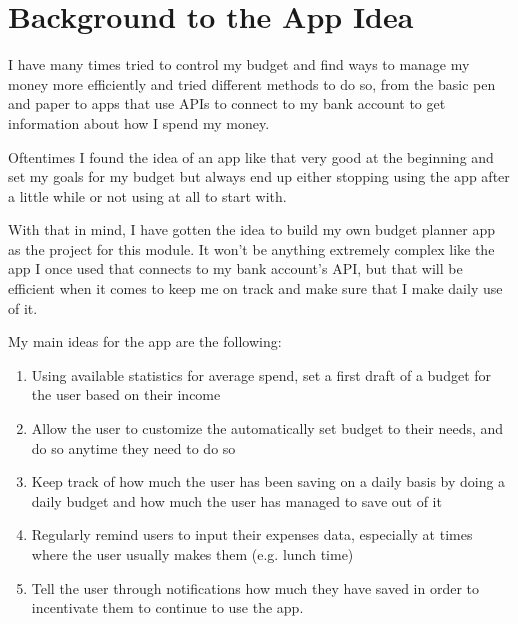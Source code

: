 \chapter{Background to the App Idea}
I have many times tried to control my budget and find ways to manage my money more efficiently and tried different methods to do so, from the basic pen and paper to apps that use APIs to connect to my bank account to get information about how I spend my money.

Oftentimes I found the idea of an app like that very good at the beginning and set my goals for my budget but always end up either stopping using the app after a little while or not using at all to start with.

With that in mind, I have gotten the idea to build my own budget planner app as the project for this module. It won't be anything extremely complex like the app I once used that connects to my bank account's API, but that will be efficient when it comes to keep me on track and make sure that I make daily use of it.

My main ideas for the app are the following:
\begin{enumerate}
  \item Using available statistics for average spend, set a first draft of a budget for the user based on their income
  \item Allow the user to customize the automatically set budget to their needs, and do so anytime they need to do so
  \item Keep track of how much the user has been saving on a daily basis by doing a daily budget and how much the user has managed to save out of it
  \item Regularly remind users to input their expenses data, especially at times where the user usually makes them (e.g. lunch time)
  \item Tell the user through notifications how much they have saved in order to incentivate them to continue to use the app.
\end{enumerate}
